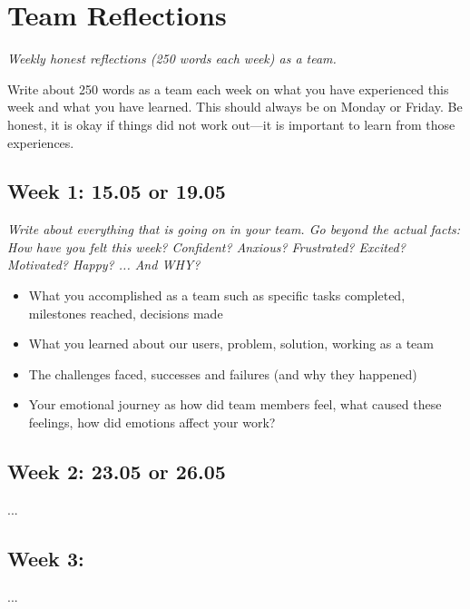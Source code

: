\section{Team Reflections}
\emph{Weekly honest reflections (250 words each week) as a team.}

Write about 250 words as a team each week on what you have experienced this week and what you have learned.
This should always be on Monday or Friday. Be honest, it is okay if things did not work out---it is important to learn from those experiences.

\subsection{Week 1: 15.05 or 19.05}
\emph{Write about everything that is going on in your team. Go beyond the actual facts: How have you felt this week? Confident? Anxious? Frustrated? Excited? Motivated? Happy? ... And WHY?}

\begin{itemize}
    \item What you accomplished as a team such as specific tasks completed, milestones reached, decisions made
    \item What you learned about our users, problem, solution, working as a team
    \item The challenges faced, successes and failures (and why they happened)
    \item Your emotional journey as how did team members feel, what caused these feelings, how did emotions affect your work?
\end{itemize}

\subsection{Week 2: 23.05 or 26.05}
...

\subsection{Week 3:}
...
